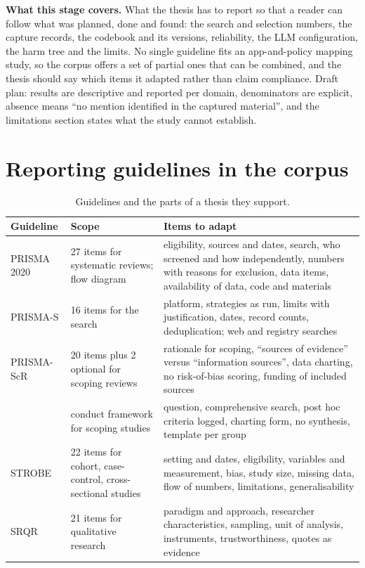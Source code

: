 
\noindent\textbf{What this stage covers.} What the thesis has to report so that a reader can follow what was planned, done and found: the search and selection numbers, the capture records, the codebook and its versions, reliability, the LLM configuration, the harm tree and the limits. No single guideline fits an app-and-policy mapping study, so the corpus offers a set of partial ones that can be combined, and the thesis should say which items it adapted rather than claim compliance. Draft plan: results are descriptive and reported per domain, denominators are explicit, absence means ``no mention identified in the captured material'', and the limitations section states what the study cannot establish.

\section{Reporting guidelines in the corpus}
\begin{table}[t]
\centering\small
\caption{Guidelines and the parts of a thesis they support.}
\label{tab:R-guidelines}
\begin{tabularx}{\textwidth}{@{}P{2.7cm}P{3.3cm}Y@{}}
\toprule
\textbf{Guideline} & \textbf{Scope} & \textbf{Items to adapt}\\
\midrule
{} PRISMA 2020 & 27 items for systematic reviews; flow diagram & eligibility, sources and dates, search, who screened and how independently, numbers with reasons for exclusion, data items, availability of data, code and materials\\
 PRISMA-S & 16 items for the search & platform, strategies as run, limits with justification, dates, record counts, deduplication; web and registry searches\\
 PRISMA-ScR & 20 items plus 2 optional for scoping reviews & rationale for scoping, ``sources of evidence'' versus ``information sources'', data charting, no risk-of-bias scoring, funding of included sources\\
 & conduct framework for scoping studies & question, comprehensive search, post hoc criteria logged, charting form, no synthesis, template per group\\
 STROBE & 22 items for cohort, case-control, cross-sectional studies & setting and dates, eligibility, variables and measurement, bias, study size, missing data, flow of numbers, limitations, generalisability\\
 SRQR & 21 items for qualitative research & paradigm and approach, researcher characteristics, sampling, unit of analysis, instruments, trustworthiness, quotes as evidence\\
\bottomrule
\end{tabularx}
\end{table}

